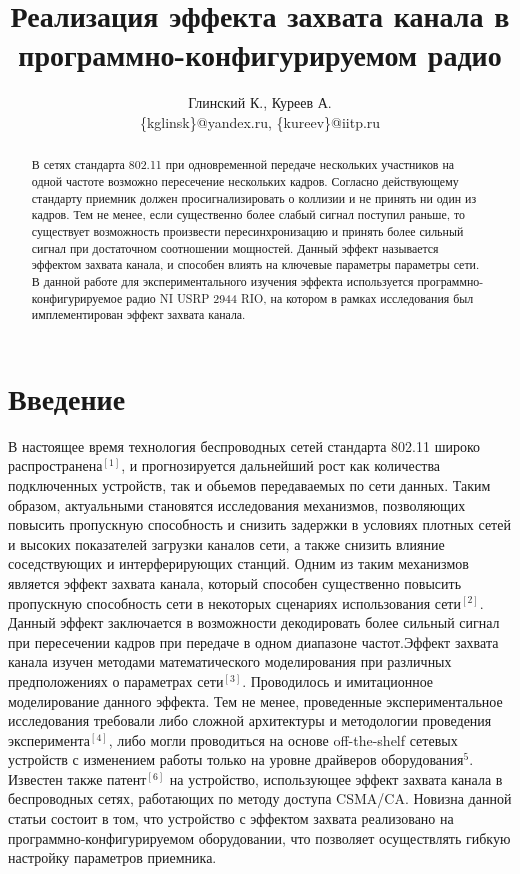 \documentclass{llncs}
\title{Реализация эффекта захвата канала в программно-конфигурируемом радио}
\author{
Глинский К., Куреев А.\\
\{kglinsk\}@yandex.ru, \{kureev\}@iitp.ru\\
}
\institute{ИППИ РАН}
\begin{document}
\maketitle

\begin{abstract}
В сетях стандарта 802.11 при одновременной передаче нескольких участников на одной частоте возможно пересечение нескольких кадров. Согласно действующему стандарту приемник должен просигнализировать о коллизии и не принять ни один из кадров. Тем не менее, если существенно более слабый сигнал поступил раньше, то существует  возможность произвести пересинхронизацию и принять более сильный сигнал при достаточном соотношении мощностей. Данный эффект называется эффектом захвата канала, и способен влиять на ключевые параметры параметры сети. В данной работе для экспериментального изучения эффекта используется  программно-конфигурируемое радио NI USRP 2944 RIO, на котором в рамках  исследования  был имплементирован эффект захвата канала.
\end{abstract}


\section{Введение}
В настоящее время технология беспроводных сетей стандарта 802.11 широко распространена$^{[1]}$, и прогнозируется дальнейший рост как количества подключенных устройств, так и обьемов передаваемых по сети данных. Таким образом, актуальными становятся исследования механизмов, позволяющих повысить пропускную способность и снизить задержки в условиях плотных сетей и высоких показателей загрузки каналов сети, а также снизить влияние соседствующих и интерферирующих станций. Одним из таким механизмов является эффект захвата канала, который способен существенно повысить пропускную способность сети в некоторых сценариях использования сети$^{[2]}$. Данный эффект заключается в возможности декодировать более сильный сигнал при пересечении кадров при передаче в одном диапазоне частот.Эффект захвата канала изучен методами математического моделирования при различных предположениях о параметрах сети$^{[3]}$. Проводилось и имитационное моделирование данного эффекта. Тем не менее, проведенные  экспериментальное исследования требовали либо сложной архитектуры и методологии проведения эксперимента$^{[4]}$, либо могли проводиться на основе off-the-shelf сетевых устройств с изменением работы  только на уровне драйверов оборудования$^{5}$. Известен также патент$^{[6]}$ на устройство, использующее эффект захвата канала в беспроводных сетях, работающих по методу доступа CSMA/CA. Новизна данной статьи состоит в том, что устройство с эффектом захвата реализовано на программно-конфигурируемом оборудовании, что позволяет осуществлять гибкую настройку параметров приемника.
\end{document}

